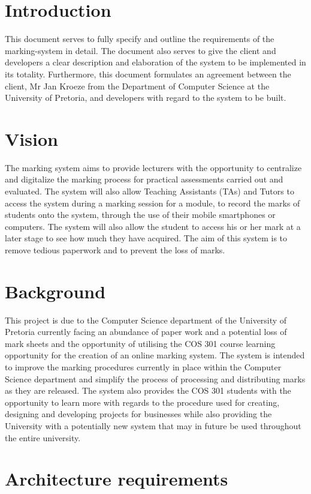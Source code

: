 \documentclass[12pt, a4paper]{scrartcl}
\begin{document}
		\section{Introduction}
			This document serves to fully specify and 		outline the requirements of the marking-system in detail. The document also serves to give the client and developers a clear description and elaboration of the system to be implemented in its totality. Furthermore, this document formulates an agreement between the client, Mr Jan Kroeze from the Department of Computer Science at the University of Pretoria, and developers with regard to the system to be built.
		\section{Vision}
			The marking system aims to provide lecturers with the opportunity to centralize and digitalize the marking process for practical assessments carried out and evaluated. The system will also allow Teaching Assistants (TAs) and Tutors to access the system during a marking session for a module, to record the marks of students onto the system, through the use of their mobile smartphones or computers. The system will also allow the student to access his or her mark at a later stage to see how much they have acquired. The aim of this system is to remove tedious paperwork and to prevent the loss of marks.
		\section{Background}
			This project is due to the Computer Science department of the University of Pretoria currently facing an abundance of paper work and a potential loss of mark sheets and the opportunity of utilising the COS 301 course learning opportunity for the creation of an online marking system. The system is intended to improve the marking procedures currently in place within the Computer Science department and simplify the process of processing and distributing marks as they are released. The system also provides the COS 301 students with the opportunity to learn more with regards to the procedure used for creating, designing and developing projects for businesses while also providing the University with a potentially new system that may in future be used throughout the entire university.
		\section{Architecture requirements}
\end{document}
